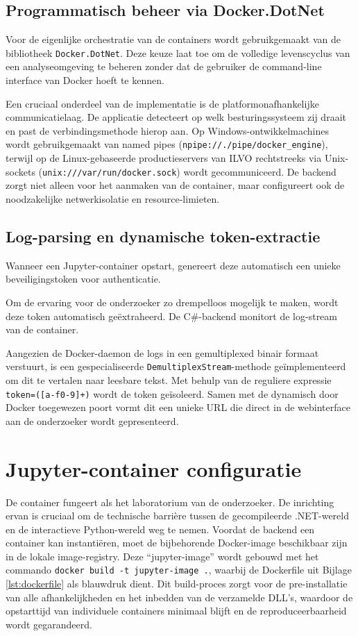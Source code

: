 \subsection{Programmatisch beheer via Docker.DotNet}
Voor de eigenlijke orchestratie van de containers wordt gebruikgemaakt van de bibliotheek \texttt{Docker.DotNet}. Deze keuze laat toe om de volledige levenscyclus van een analyseomgeving te beheren zonder dat de gebruiker de command-line interface van Docker hoeft te kennen.

{\sloppy Een cruciaal onderdeel van de implementatie is de platformonafhankelijke communicatielaag. De applicatie detecteert op welk besturingssysteem zij draait en past de verbindingsmethode hierop aan. Op Windows-ontwikkelmachines wordt gebruikgemaakt van named pipes (\nolinkurl{npipe://./pipe/docker\_engine}), terwijl op de Linux-gebaseerde productieservers van ILVO rechtstreeks via Unix-sockets (\nolinkurl{unix:///var/run/docker.sock}) wordt gecommuniceerd. De backend zorgt niet alleen voor het aanmaken van de container, maar configureert ook de noodzakelijke netwerkisolatie en resource-limieten.\par}

\subsection{Log-parsing en dynamische token-extractie}
Wanneer een Jupyter-container opstart, genereert deze automatisch een unieke beveiligingstoken voor authenticatie. {\sloppy Om de ervaring voor de onderzoeker zo drempelloos mogelijk te maken, wordt deze token automatisch geëxtraheerd. De C\#-backend monitort de log-stream van de container. \par}

Aangezien de Docker-daemon de logs in een gemultiplexed binair formaat verstuurt, is een gespecialiseerde \texttt{DemultiplexStream}-methode geïmplementeerd om dit te vertalen naar leesbare tekst. Met behulp van de reguliere expressie \texttt{token=([a-f0-9]+)} wordt de token geïsoleerd. Samen met de dynamisch door Docker toegewezen poort vormt dit een unieke URL die direct in de webinterface aan de onderzoeker wordt gepresenteerd.

\section{Jupyter-container configuratie}

De container fungeert als het laboratorium van de onderzoeker. De inrichting ervan is cruciaal om de technische barrière tussen de gecompileerde .NET-wereld en de interactieve Python-wereld weg te nemen. Voordat de backend een container kan instantiëren, moet de bijbehorende Docker-image beschikbaar zijn in de lokale image-registry. Deze ``jupyter-image'' wordt gebouwd met het commando \texttt{docker build -t jupyter-image .}, waarbij de Dockerfile uit Bijlage \ref{lst:dockerfile} als blauwdruk dient. Dit build-proces zorgt voor de pre-installatie van alle afhankelijkheden en het inbedden van de verzamelde DLL's, waardoor de opstarttijd van individuele containers minimaal blijft en de reproduceerbaarheid wordt gegarandeerd.

